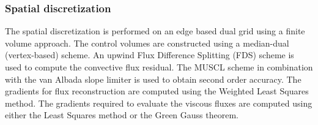 \subsubsection{Spatial discretization}\label{ssec:spdisc}
\noindent The spatial discretization is performed on an edge based dual grid using a finite volume approach. The control volumes are constructed using a median-dual (vertex-based) scheme. 
An upwind Flux Difference Splitting (FDS) scheme is used to compute the convective flux residual. 
The MUSCL scheme in combination with the van Albada slope limiter is used to obtain second order accuracy. The gradients for flux reconstruction are computed using the Weighted Least Squares method. The gradients required to evaluate the viscous fluxes are computed using either the Least Squares method or the Green Gauss theorem.

